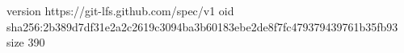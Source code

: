 version https://git-lfs.github.com/spec/v1
oid sha256:2b389d7df31e2a2c2619c3094ba3b60183ebe2de8f7fc479379439761b35fb93
size 390
